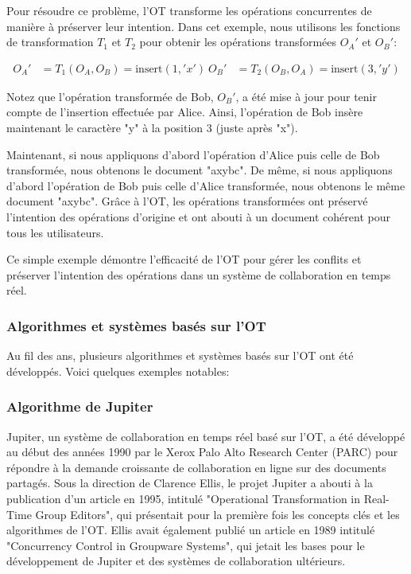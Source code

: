 Pour résoudre ce problème, l'OT transforme les opérations concurrentes de manière à préserver leur intention. Dans cet exemple, nous utilisons les fonctions de transformation $T_1$ et $T_2$ pour obtenir les opérations transformées $O_A'$ et $O_B'$:

\begin{equation}
\begin{aligned}
O_A' &= T_1(O_A, O_B) = \text{insert}(1, 'x')\
O_B' &= T_2(O_B, O_A) = \text{insert}(3, 'y')
\end{aligned}
\end{equation}

Notez que l'opération transformée de Bob, $O_B'$, a été mise à jour pour tenir compte de l'insertion effectuée par Alice. Ainsi, l'opération de Bob insère maintenant le caractère "y" à la position 3 (juste après "x").

Maintenant, si nous appliquons d'abord l'opération d'Alice puis celle de Bob transformée, nous obtenons le document "axybc". De même, si nous appliquons d'abord l'opération de Bob puis celle d'Alice transformée, nous obtenons le même document "axybc". Grâce à l'OT, les opérations transformées ont préservé l'intention des opérations d'origine et ont abouti à un document cohérent pour tous les utilisateurs.

Ce simple exemple démontre l'efficacité de l'OT pour gérer les conflits et préserver l'intention des opérations dans un système de collaboration en temps réel.
\subsubsection{Algorithmes et systèmes basés sur l'OT}

Au fil des ans, plusieurs algorithmes et systèmes basés sur l'OT ont été développés. Voici quelques exemples notables:

\subsubsection{Algorithme de Jupiter}

Jupiter, un système de collaboration en temps réel basé sur l'OT, a été développé au début des années 1990 par le Xerox Palo Alto Research Center (PARC) pour répondre à la demande croissante de collaboration en ligne sur des documents partagés\cite{jupiter}. Sous la direction de Clarence Ellis, le projet Jupiter a abouti à la publication d'un article en 1995, intitulé "Operational Transformation in Real-Time Group Editors"\cite{ellis1995}, qui présentait pour la première fois les concepts clés et les algorithmes de l'OT. Ellis avait également publié un article en 1989 intitulé "Concurrency Control in Groupware Systems"\cite{ellis1989}, qui jetait les bases pour le développement de Jupiter et des systèmes de collaboration ultérieurs.

